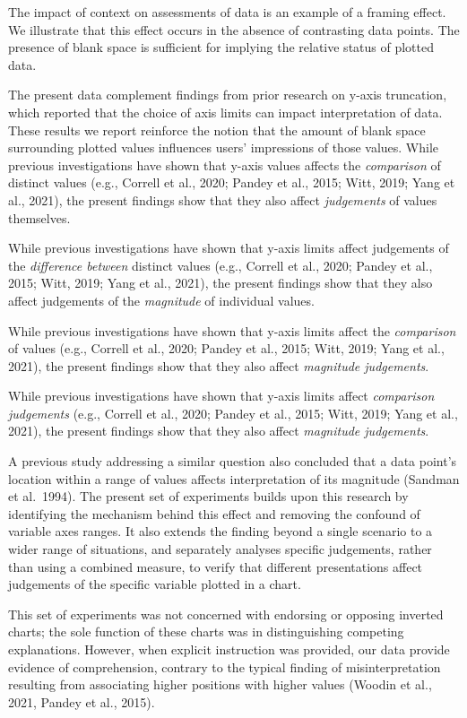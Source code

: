 \documentclass[journal]{vgtc}                %
\begin{document}
The impact of context on assessments of data is an example of a framing effect. We illustrate that this effect occurs in the absence of contrasting data points. The presence of blank space is sufficient for implying the relative status of plotted data.

The present data complement findings from prior research on y-axis truncation, which reported that the choice of axis limits can impact interpretation of data. These results we report reinforce the notion that the amount of blank space surrounding plotted values influences users' impressions of those values. While previous investigations have shown that y-axis values affects the \emph{comparison} of distinct values (e.g., Correll et al., 2020; Pandey et al., 2015; Witt, 2019; Yang et al., 2021), the present findings show that they also affect \emph{judgements} of values themselves.

While previous investigations have shown that y-axis limits affect judgements of the \emph{difference between} distinct values (e.g., Correll et al., 2020; Pandey et al., 2015; Witt, 2019; Yang et al., 2021), the present findings show that they also affect judgements of the \emph{magnitude} of individual values.

While previous investigations have shown that y-axis limits affect the \emph{comparison} of values (e.g., Correll et al., 2020; Pandey et al., 2015; Witt, 2019; Yang et al., 2021), the present findings show that they also affect \emph{magnitude judgements}.

While previous investigations have shown that y-axis limits affect \emph{comparison judgements} (e.g., Correll et al., 2020; Pandey et al., 2015; Witt, 2019; Yang et al., 2021), the present findings show that they also affect \emph{magnitude judgements}.

A previous study addressing a similar question also concluded that a data point's location within a range of values affects interpretation of its magnitude (Sandman et al.~1994). The present set of experiments builds upon this research by identifying the mechanism behind this effect and removing the confound of variable axes ranges. It also extends the finding beyond a single scenario to a wider range of situations, and separately analyses specific judgements, rather than using a combined measure, to verify that different presentations affect judgements of the specific variable plotted in a chart.

This set of experiments was not concerned with endorsing or opposing inverted charts; the sole function of these charts was in distinguishing competing explanations. However, when explicit instruction was provided, our data provide evidence of comprehension, contrary to the typical finding of misinterpretation resulting from associating higher positions with higher values (Woodin et al., 2021, Pandey et al., 2015).
\end{document}
